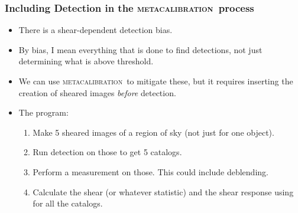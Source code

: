 \documentclass{beamer}
\newcommand{\mcal}{\textsc{metacalibration}}
\begin{document}
\frame
{
    \frametitle{Including Detection in the \mcal\ process}

 
    \begin{itemize}

        \item There is a shear-dependent detection bias.

        \item By bias, I mean everything that is done to find detections,
            not just determining what is above threshold.

        \item We can use \mcal\ to mitigate these, but it requires
            inserting the creation of sheared images {\em before}
            detection.

        \item The program:
            \begin{enumerate}

                \item Make 5 sheared images of a region of sky (not just for one object).

                \item Run detection on those to get 5 catalogs.
                \item Perform a measurement on those.  This could include
                    deblending.
                \item Calculate the shear (or whatever statistic)
                    and the shear response using
                    for all the catalogs.
            \end{enumerate}

    \end{itemize}

}
\end{document}
